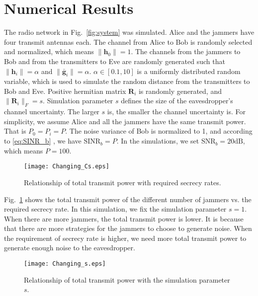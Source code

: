\documentclass[conference]{IEEEtran}
\begin{document}
\section{Numerical Results} \label{sec:numerical results}
The radio network in Fig.~\ref{fig:system} was simulated. Alice and the jammers have four transmit antennas each. The channel from Alice to Bob is randomly selected and normalized, which means $\|\mathbf{h}_0\| = 1$. The channels from the jammers to Bob and from the transmitters to Eve are randomly generated such that $\|\mathbf{h}_i\| = \alpha$ and $\|\bar{\mathbf{g}}_i\| = \alpha$. $\alpha \in  [0.1,10]$ is a uniformly distributed random variable, which is used to simulate the random distance from the transmitters to Bob and Eve. Positive hermitian matrix $\mathbf{R}_i$ is randomly generated, and $\|\mathbf{R}_i\|_F = s$. Simulation parameter $s$ defines the size of the eavesdropper's channel uncertainty. The larger $s$ is, the smaller the channel uncertainty is. 
For simplicity, we assume Alice and all the jammers have the same transmit power. That is $P_0=P_i = P$. The noise variance of Bob is normalized to 1,  and according to \eqref{eq:SINR_b} , we have $\mathrm{SINR}_b = P$. In the simulations, we set $\mathrm{SNR}_b = 20 \mathrm{dB}$, which means $P = 100$.


\begin{figure}[!ht]
	\centering
	\texttt{[image: Changing\_Cs.eps]} %
	\caption{Relationship of total transmit power with required secrecy rates.}
	\label{fig:Changing_Cs}
\end{figure}

Fig.~\ref{fig:Changing_Cs} shows the total transmit power of the different number of jammers vs. the required secrecy rate. In this simulation, we fix the simulation parameter $s = 1$. When there are more jammers, the total transmit power is lower. It is because that there are more strategies for the jammers to choose to generate noise. When the requirement of secrecy rate is higher, we need more total transmit power to generate enough noise to the eavesdropper. %

\begin{figure}[!ht]
	\centering
	\texttt{[image: Changing\_s.eps]} %
	\caption{Relationship of total transmit power with the simulation parameter $s$.}
	\label{fig:Changing_s}
\end{figure}
\end{document}

